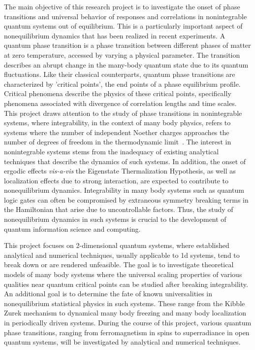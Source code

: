 \documentclass[a4paper,11pt,color]{article}
\begin{document}
The main objective of this research project is to investigate the onset of phase transitions and universal behavior of responses and correlations in nonintegrable quantum systems out of equilibrium. This is a particularly important aspect of nonequilibrium dynamics that has been realized in recent experiments. A quantum phase transition is a phase transition between different phases of matter at zero temperature, accessed by varying a physical parameter. The transition describes an abrupt change in the many-body quantum state due to its quantum fluctuations. Like their classical counterparts, quantum phase transitions are characterized by 'critical points', the end points of a phase equilibrium profile.  Critical phenomena describe the physics of these critical points, specifically phenomena associated with 
divergence of correlation lengths and time scales. This project draws attention to the study of phase transitions in nonintegrable systems, where integrability, in the context of many body physics, refers to systems where the number of independent Noether charges approaches the number of degrees of freedom in the thermodynamic limit~\cite{thermalization}. The interest in nonintegrable systems stems from the inadequacy of existing analytical techniques that describe the dynamics of such systems. In addition, the onset of ergodic effects \textit{vis-a-vis} the Eigenstate Thermalization Hypothesis, as well as localization effects due to strong interaction, are expected to contribute to nonequilibrium dynamics. Integrability in many body systems such as quantum logic gates can often be compromised by extraneous symmetry breaking terms in the Hamiltonian that arise due to uncontrollable factors. Thus, the study of nonequilibrium dynamics in such systems is crucial to the development of quantum information science and computing.

This project focuses on 2-dimensional quantum systems, where established analytical and numerical techniques, usually applicable to 1d systems, tend to break down or are rendered unfeasible. The goal is to investigate theoretical models of many body systems where the universal scaling properties of various qualities near quantum critical points can be studied after breaking integrability.  An additional goal is to determine the fate of known universalities in nonequilibrium statistical physics in such systems. These range from the Kibble Zurek mechanism to dynamical many body freezing and many body localization in periodically driven systems. During the course of this project, various quantum phase transitions, ranging from ferromagnetism in spins to superradiance in open quantum systems, will be investigated by analytical and numerical techniques.
\end{document}
